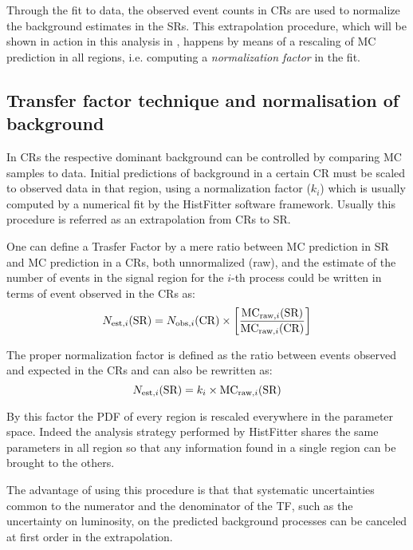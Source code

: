 Through the fit to data, the observed event counts in CRs are used to normalize the background estimates in the SRs. This extrapolation procedure, which will be shown in action in this analysis in \Fig{\ref{fig:regions}}, happens by means of a rescaling of MC prediction in all regions, i.e. computing a \emph{normalization factor} in the fit.


\subsection{Transfer factor technique and normalisation of background}
\label{sec:kfactor}
In CRs the respective dominant background can be controlled by comparing MC samples to data. Initial predictions of background in a certain CR must be scaled to observed data in that region, using a normalization factor ($k_{i}$) which is usually computed by a numerical fit by the HistFitter software framework. Usually this procedure is referred as an extrapolation from CRs to SR.

One can define a Trasfer Factor by a mere ratio between MC prediction in SR and MC prediction in a CRs, both unnormalized (raw), and the estimate of the number of events in the signal region for the $i$-th process could be written in terms of event observed in the CRs as:
\begin{equation}
  \label{eqn:TF}
  N_{\textup{est},i}(\text{SR}) =  N_{\textup{obs},i}({\text{CR}}) \times \left[\frac{\text{MC}_{\textup{raw},i}(\text{SR})}{\text{MC}_{\textup{raw},i}(\text{CR})} \right]
\end{equation}

The proper normalization factor is defined as the ratio between events observed and expected in the CRs and \Eqn{\ref{eqn:TF}} can also be rewritten as:
\begin{equation}
  N_{\textup{est},i}(\text{SR}) = k_{i}\times\text{MC}_{\textup{raw},i}(\text{SR})
\end{equation}

By this factor the PDF of every region is rescaled everywhere in the parameter space. Indeed the analysis strategy performed by HistFitter shares the same parameters in all region so that any information found in a single region can be brought to the others.

The advantage of using this procedure is that that systematic uncertainties common to the numerator and the denominator of the TF, such as the uncertainty on luminosity, on the predicted background processes can be canceled at first order in the extrapolation.

